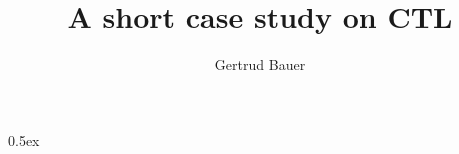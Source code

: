 \documentclass[11pt,a4paper]{article}
\begin{document}
\title{A short case study on CTL}
\author{Gertrud Bauer}
\maketitle
\tableofcontents
\bigskip

\parindent 0pt\parskip 0.5ex
\newcommand{\tweakskip}{\vspace{-\smallskipamount}\vspace{-\parskip}}



%
%
\end{document}
